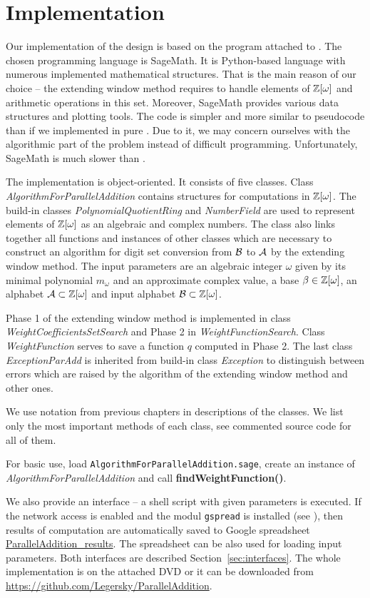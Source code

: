 \section{Implementation}
\label{sec:implementation}
Our implementation of the design is based on the program attached to \cite{vu}. The chosen programming language is SageMath. It is Python-based language with numerous implemented mathematical structures. That is the main reason of our choice -- the extending window method requires to handle elements of $\mathbb{Z}[\omega]$ and arithmetic operations in this set. Moreover, SageMath provides various data structures and plotting tools.  The code is simpler and more similar to pseudocode than if we implemented in pure \Cpp. Due to it, we may concern ourselves with the algorithmic part of the problem instead of difficult programming. Unfortunately, SageMath is much slower than \Cpp.


The implementation is object-oriented. It consists of five classes. Class \emph{AlgorithmForParallelAddition} contains structures for computations in $\mathbb{Z}[\omega]$. The build-in classes \emph{PolynomialQuotientRing} and \emph{NumberField} are used to represent elements of $\mathbb{Z}[\omega]$ as an algebraic and complex numbers. The class also links together all functions and instances of other classes which are necessary to construct an algorithm for digit set conversion from $\mathcal{B}$ to $\mathcal{A}$ by the extending window method. The input parameters are an algebraic integer $\omega$ given by its minimal polynomial $m_\omega$ and an approximate complex value, a base $\beta\in\mathbb{Z}[\omega]$, an alphabet $\mathcal{A}\subset\mathbb{Z}[\omega]$ and input alphabet $\mathcal{B}\subset\mathbb{Z}[\omega]$. 

Phase 1 of the extending window method is implemented in class \emph{WeightCoefficientsSetSearch} and Phase 2 in \emph{WeightFunctionSearch}. Class \emph{WeightFunction} serves to save a function $q$ computed in Phase 2. The last class \emph{ExceptionParAdd} is inherited from build-in class \emph{Exception} to distinguish between errors which are raised by the algorithm  of the extending window method and other ones.

We use notation from previous chapters in descriptions of the classes. We list only the most important methods of each class, see commented source code for all of them.  

For basic use, load \verb+AlgorithmForParallelAddition.sage+, create an instance of \emph{AlgorithmForParallelAddition} and call \textbf{findWeightFunction()}.

We also provide an interface -- a shell script with given parameters is executed. If the network access is enabled and the modul \verb+gspread+ is installed (see \cite{gspread}), then results of computation are automatically saved to Google spreadsheet \href{https://docs.google.com/spreadsheets/d/1TnhrHdefHfHa0WSeVs4q6XVj3epjPlPlnoekE0E1xeM/edit?usp=sharing}{ParallelAddition\_results}. The spreadsheet can be also used for loading input parameters. Both interfaces are described Section~\ref{sec:interfaces}. The whole implementation is on the attached DVD or it can be downloaded from  \url{https://github.com/Legersky/ParallelAddition}.



